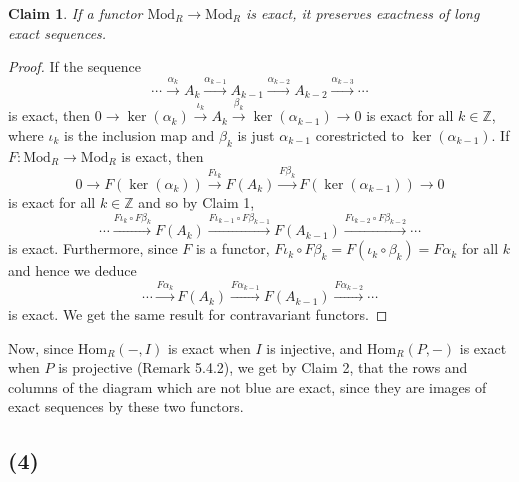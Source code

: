 \documentclass{article}
\newcommand{\Hom}[2]{\mathrm{Hom}_R(#1, #2)}
\newcommand{\Z}{\mathbb{Z}}
\newtheorem{claim}{Claim}
\begin{document}
\begin{claim}
	If a functor $\mathrm{Mod}_R \to \mathrm{Mod}_R$ is exact,
	it preserves exactness of long exact sequences.
\end{claim}
\begin{proof}
If the sequence
$$\cdots \xrightarrow{\alpha_k} A_k \xrightarrow{\alpha_{k-1}}
A_{k-1} \xrightarrow{\alpha_{k-2}}
A_{k-2} \xrightarrow{\alpha_{k-3}} \cdots $$
is exact, then $0 \to \ker(\alpha_k) \xrightarrow{\iota_k} A_k
\xrightarrow{\beta_k} \ker(\alpha_{k-1}) \to 0$ is exact
for all $k \in \Z$, where
$\iota_k$ is the inclusion map and
$\beta_k$ is just $\alpha_{k-1}$ corestricted to
$\ker(\alpha_{k-1})$. If $F: \mathrm{Mod}_R \to \mathrm{Mod}_R$
is exact, then 
$$0 \to F(\ker(\alpha_k)) \xrightarrow{F\iota_k} F(A_k)
\xrightarrow{F\beta_k} F(\ker(\alpha_{k-1})) \to 0$$
is exact for all $k \in \Z$ and so by Claim 1,
$$\cdots \xrightarrow{F\iota_k\circ F\beta_k}
F(A_k) \xrightarrow{F\iota_{k-1}
\circ F\beta_{k-1}}
F(A_{k-1}) \xrightarrow{F\iota_{k-2}\circ F\beta_{k-2}} \cdots$$
is exact. Furthermore, since $F$ is a functor,
$F\iota_k\circ F\beta_k = F(\iota_k \circ \beta_k) = F\alpha_k$ for
all $k$ and hence we deduce
$$\cdots \xrightarrow{F\alpha_k}
F(A_k) \xrightarrow{F\alpha_{k-1}}
F(A_{k-1}) \xrightarrow{F\alpha_{k-2}} \cdots$$
is exact. We get the same result for contravariant functors.
\end{proof}

Now, since $\Hom{-}{I}$ is exact when $I$ is injective, and
$\Hom{P}{-}$ is exact when $P$ is projective (Remark 5.4.2), we get
by Claim 2, that the rows and columns of the diagram which are
not blue are exact, since they are images of exact sequences by
these two functors.

\subsection*{(4)}
\end{document}
